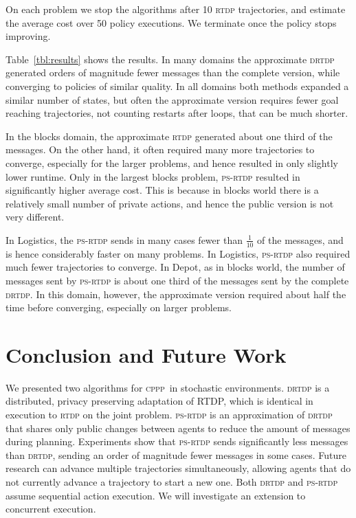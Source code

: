 \documentclass[letterpaper]{article} %
\newcommand{\mafs}{\textsc {mafs}\xspace}
\newcommand{\cppp}{\textsc {cppp}\xspace}
\newcommand{\rtdp}{\textsc {rtdp}\xspace}
\newcommand{\drtdp}{\textsc {drtdp}\xspace}
\newcommand{\psrtdp}{\textsc{ps}-\textsc{rtdp}\xspace}
\theoremstyle{remark}
\begin{document}
On each problem we stop the algorithms after 10 \rtdp trajectories, and estimate the average cost over 50 policy executions. We terminate once the policy stops improving.

Table~\ref{tbl:results} shows the results. In many domains the approximate \drtdp generated orders of magnitude fewer messages than the complete version, while converging to policies of similar quality. In all domains both methods expanded a similar number of states, but often the approximate version requires fewer goal reaching trajectories, not counting restarts after loops, that can be much shorter.

In the blocks domain, the approximate \rtdp generated about one third of the messages. On the other hand, it often required many more trajectories to converge, especially for the larger problems, and hence resulted in only slightly lower runtime. Only in the largest blocks problem, \psrtdp resulted in significantly higher average cost. This is because in blocks world there is a relatively small number of private actions, and hence the public version is not very different.

In Logistics, the \psrtdp sends in many cases fewer than $\frac{1}{10}$ of the messages, and is hence considerably faster on many problems. In Logistics, \psrtdp also required much fewer trajectories to converge.
In Depot, as in blocks world, the number of messages sent by \psrtdp is about one third of the messages sent by the complete \drtdp. In this domain, however, the approximate version required about half the time before converging, especially on larger problems.



\section{Conclusion and Future Work}
We presented two algorithms for \cppp\ in stochastic environments. \drtdp is a distributed, privacy preserving adaptation of RTDP, which is identical in execution to \rtdp on the joint problem. %
\psrtdp is an approximation of \drtdp that shares only public changes between agents to reduce the amount of messages during planning. Experiments show that \psrtdp sends significantly less messages than \drtdp,
sending an order of magnitude fewer messages in some cases. %
Future research can advance multiple trajectories simultaneously, allowing agents that do not currently advance a trajectory to start a new one. %
Both \drtdp and \psrtdp assume sequential action execution. We will investigate an extension to concurrent execution.



\clearpage

\end{document}
